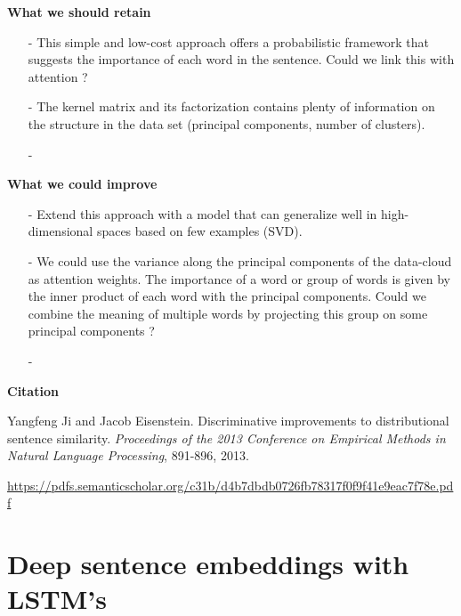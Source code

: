 \textbf{What we should retain}

\begin{enumerate}[topsep = 0pt, itemsep = 0pt]
    \item[-] This simple and low-cost approach offers a probabilistic framework that suggests the importance of each word in the sentence. Could we link this with attention ?
    
    \item[-] The kernel matrix and its factorization contains plenty of information on the structure in the data set (principal components, number of clusters). 
    
    \item[-]
    
\end{enumerate}


\textbf{What we could improve}

\begin{enumerate}[topsep = 0pt, itemsep = 0pt]
    \item[-] Extend this approach with a model that can generalize well in high-dimensional spaces based on few examples (SVD).
    
    \item[-] We could use the variance along the principal components of the data-cloud as attention weights. The importance of a word or group of words is given by the inner product of each word with the principal components.
    Could we combine the meaning of multiple words by projecting this group on some principal components ?
    
    \item[-]
    
\end{enumerate}


\textbf{Citation}

    Yangfeng Ji and Jacob Eisenstein.
    Discriminative improvements to distributional sentence similarity.
    \textit{Proceedings of the 2013 Conference on Empirical Methods in Natural Language Processing}, 891-896, 2013.

\url{https://pdfs.semanticscholar.org/c31b/d4b7dbdb0726fb78317f0f9f41e9eac7f78e.pdf}



\newpage
\section{Deep sentence embeddings with LSTM's}

